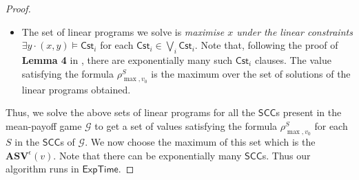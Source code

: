 \begin{proof}
\begin{enumerate}
\begin{itemize}
      \item The set of linear programs we solve is \textit{maximise $x$ under the linear constraints $\exists y \cdot (x,y) \models \mathsf{Cst}_i$} for each $\mathsf{Cst}_i \in \bigvee_i \mathsf{Cst}_i$. Note that, following the proof of \textbf{Lemma 4} in \cite{BR15}, there are exponentially many such $\mathsf{Cst}_i$ clauses. The value satisfying the formula $\rho^S_{\max,v_0}$ is the maximum over the set of solutions of the linear programs obtained.
\end{itemize}
\end{enumerate}

Thus, we solve the above sets of linear programs for all the $\mathsf{SCC}$s present in the mean-payoff game $\mathcal{G}$ to get a set of values satisfying the formula $\rho^S_{\max,v_0}$ for each $S$ in the $\mathsf{SCC}$s of $\mathcal{G}$. We now choose the maximum of this set
which is the $\mathbf{ASV}^{\epsilon}(v)$. Note that 
there can be exponentially many $\mathsf{SCC}$s.
Thus our algorithm runs in $\mathsf{ExpTime}$.
\end{proof}
